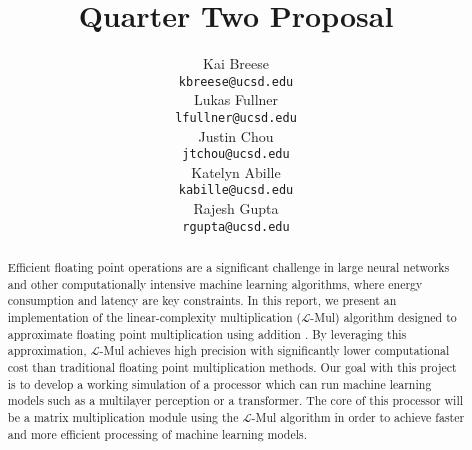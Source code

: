 \documentclass[12pt,letterpaper]{article}
\title{Quarter Two Proposal}
\author{Kai Breese \\
  {\tt kbreese@ucsd.edu} \\\And
  Lukas Fullner \\
  {\tt lfullner@ucsd.edu} \\\And
  Justin Chou \\
  {\tt jtchou@ucsd.edu} \\\And
  Katelyn Abille \\
  {\tt kabille@ucsd.edu} \\\And
  Rajesh Gupta \\
  {\tt rgupta@ucsd.edu} \\}
\newcommand{\lmul}{$\mathcal{L}$-Mul\xspace}
\begin{document}
\maketitle



\begin{abstract}
    
Efficient floating point operations are a significant challenge in large neural networks and other computationally intensive machine learning algorithms, where energy consumption and latency are key constraints. In this report, we present an implementation of the linear-complexity multiplication (\lmul) algorithm designed to approximate floating point multiplication using addition \citep{luo2024addition}. By leveraging this approximation, \lmul achieves high precision with significantly lower computational cost than traditional floating point multiplication methods.  Our goal with this project is to develop a working simulation of a processor which can run machine learning models such as a multilayer perception or a transformer.  The core of this processor will be a matrix multiplication module using the \lmul algorithm in order to achieve faster and more efficient processing of machine learning models.
    
\end{abstract}


\maketoc
\clearpage

\end{document}
